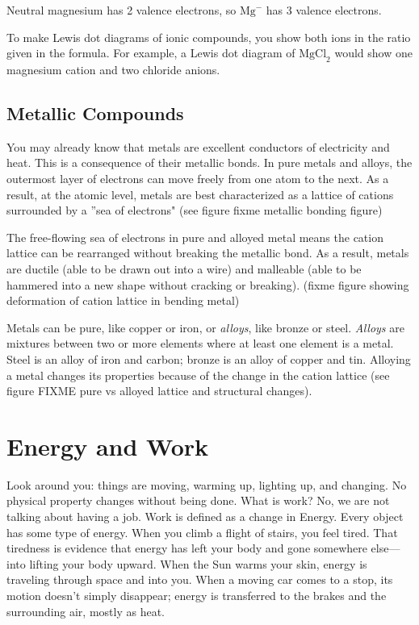 Neutral magnesium has 2 valence electrons, so $\text{Mg}^{-}$ has 3 valence 
electrons. 
\begin{center}
\end{center}

To make Lewis dot diagrams of ionic compounds, you show both ions in the ratio 
given in the formula. For example, a Lewis dot diagram of $\text{MgCl}_2$ would 
show one magnesium cation and two chloride anions. 

\subsection{Metallic Compounds}
You may already know that metals are excellent conductors 
of electricity and heat. This is a consequence of their metallic bonds. In pure 
metals and alloys, the outermost layer of electrons can move freely from one atom 
to the next. As a result, at the atomic level, metals are best characterized as a 
lattice of cations surrounded by a ''sea of electrons" (see figure	fixme metallic bonding figure)

The free-flowing sea of electrons in pure and alloyed metal means the cation 
lattice can be rearranged without breaking the metallic bond. As a result, metals 
are ductile (able to be drawn out into a wire) and malleable (able to be hammered 
into a new shape without cracking or breaking). (fixme figure showing deformation of cation lattice in bending metal)

Metals can be pure, like copper or iron, or \textit{alloys}, like bronze or steel. 
\textit{Alloys} are mixtures between two or more elements where at least one 
element is a metal. Steel is an alloy of iron and carbon; bronze is 
an alloy of copper and tin. Alloying a metal changes its properties because of 
the change in the cation lattice (see figure FIXME pure vs alloyed lattice and 
structural changes). 

\section{Energy and Work}
Look around you: things are moving, warming up, lighting up, and changing. No physical property changes without  being done. What is work? No, we are not talking about having a job. Work is defined as a change in Energy. Every object has some type of energy. When you climb a flight of stairs, you feel tired. That tiredness is evidence that energy has left your body and gone somewhere else—into lifting your body upward. When the Sun warms your skin, energy is traveling through space and into you. When a moving car comes to a stop, its motion doesn't simply disappear; energy is transferred to the brakes and the surrounding air, mostly as heat.

